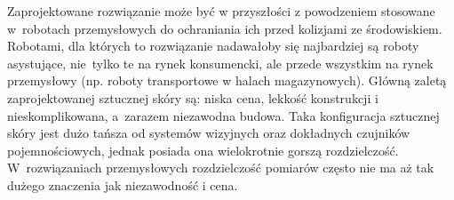
Zaprojektowane rozwiązanie może być w przyszłości z powodzeniem stosowane w~robotach przemysłowych do ochraniania ich przed kolizjami ze środowiskiem. Robotami, dla których to rozwiązanie nadawałoby się najbardziej są roboty asystujące, nie~tylko te na rynek konsumencki, ale przede wszystkim na rynek przemysłowy (np. roboty transportowe w halach magazynowych). Główną zaletą zaprojektowanej sztucznej skóry są: niska cena, lekkość konstrukcji i nieskomplikowana, a~zarazem niezawodna budowa. Taka konfiguracja sztucznej skóry jest dużo tańsza od systemów wizyjnych oraz dokładnych czujników pojemnościowych, jednak posiada ona wielokrotnie gorszą rozdzielczość. W~rozwiązaniach przemysłowych rozdzielczość pomiarów często nie ma aż tak dużego znaczenia jak niezawodność i cena.
